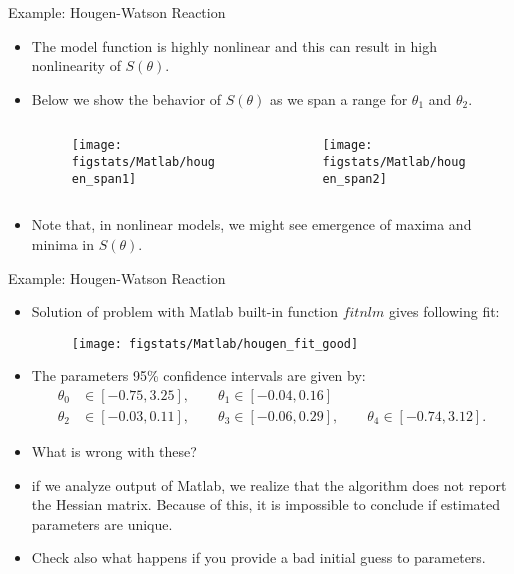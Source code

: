 \documentclass[9pt]{beamer}
\begin{document}
%
\begin{frame}{Example: Hougen-Watson Reaction}

\begin{itemize}
\item The model function is highly nonlinear and this can result in high nonlinearity of $S(\theta)$.
\item Below we show the behavior of $S(\theta)$ as we span a range for $\theta_1$ and $\theta_2$.
\begin{columns}
\begin{column}{0.5\textwidth}
\begin{figure}[!htb]
    \centering
	\texttt{[image: figstats/Matlab/hougen\_span1]}
\end{figure}
\end{column}
\begin{column}{0.5\textwidth}
\begin{figure}[!htb]
    \centering
	\texttt{[image: figstats/Matlab/hougen\_span2]}
\end{figure}
\end{column}
\end{columns}
\item Note that, in nonlinear models, we might see emergence of maxima and minima in $S(\theta)$.

\end{itemize}


\end{frame}

%
\begin{frame}{Example: Hougen-Watson Reaction}

\begin{itemize}
\item Solution of problem with Matlab built-in function $fitnlm$ gives following fit:
\begin{figure}[!htb]
    \centering
	\texttt{[image: figstats/Matlab/hougen\_fit\_good]}
\end{figure}
\item The parameters 95\% confidence intervals are given by:
\begin{align*}
\theta_0&\in [-0.75, 3.25],\qquad \theta_1\in [-0.04, 0.16]\\
\theta_2&\in [-0.03 ,0.11],\qquad \theta_3\in [-0.06, 0.29],\qquad \theta_4\in [ -0.74,3.12].
\end{align*}
\item What is wrong with these?
\pause 
\item if we analyze output of Matlab, we realize that the algorithm does not report the Hessian matrix. Because of this, it is impossible to conclude if estimated parameters are unique. 
\item Check also what happens if you provide a bad initial guess to parameters. 
\end{itemize}


\end{frame}
\end{document}
